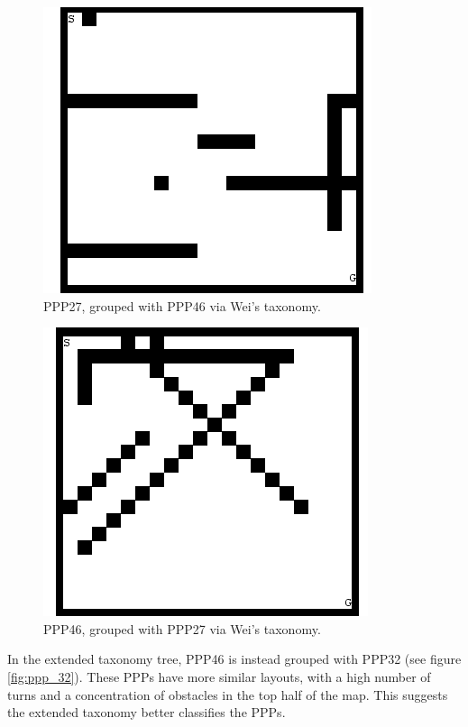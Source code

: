 \documentclass[authoryearcitations]{UoYCSproject}
\begin{document}
\begin{figure}[H]
\graphicspath{ {EvalPics/} }
\includegraphics[scale=0.65]{ppp27.png}
\caption{PPP27, grouped with PPP46 via Wei's taxonomy.}
\label{fig:ppp_27}
\end{figure}

\begin{figure}[H]
\graphicspath{ {EvalPics/} }
\includegraphics[scale=0.65]{ppp46.png}
\caption{PPP46, grouped with PPP27 via Wei's taxonomy.}
\label{fig:ppp_46}
\end{figure}

In the extended taxonomy tree, PPP46 is instead grouped with PPP32 (see figure \ref{fig:ppp_32}). These PPPs have more similar layouts, with a high number of turns and a concentration of obstacles in the top half of the map. This suggests the extended taxonomy better classifies the PPPs.
\end{document}
